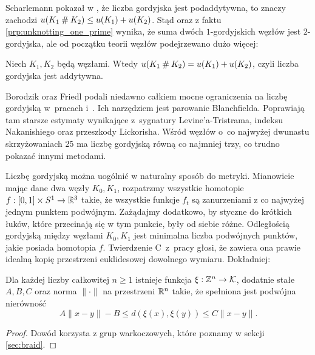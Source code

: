 Scharlemann pokazał w \cite[wniosek 1.6]{scharlemann98}, że liczba gordyjska jest podaddytywna, to znaczy zachodzi $u(K_1 \mathbin{\#} K_2) \le u(K_1) + u(K_2)$.
Stąd oraz z faktu \ref{prp:unknotting_one_prime} wynika, że suma dwóch $1$-gordyjskich węzłów jest $2$-gordyjska, ale od początku teorii węzłów podejrzewano dużo więcej:

\begin{conjecture}
    Niech $K_1, K_2$ będą węzłami.
    Wtedy $u(K_1 \mathbin{\#} K_2) = u(K_1) + u(K_2)$, czyli liczba gordyjska jest addytywna.
\end{conjecture}

Borodzik oraz Friedl podali niedawno całkiem mocne ograniczenia na liczbę gordyjską w~pracach \cite{borodzik14} i~\cite{borodzik15}.
Ich narzędziem jest parowanie Blanchfielda.
Poprawiają tam starsze estymaty wynikające z~sygnatury Levine'a-Tristrama, indeksu Nakanishiego oraz przeszkody Lickorisha.
%
%
%
%
Wśród węzłów o~co najwyżej dwunastu skrzyżowaniach 25 ma liczbę gordyjską równą co najmniej trzy, co trudno pokazać innymi metodami.

Liczbę gordyjską można uogólnić w naturalny sposób do metryki.
Mianowicie mając dane dwa węzły $K_0, K_1$, rozpatrzmy wszystkie homotopie $f : [0,1] \times S^1 \to \mathbb R^3$ takie, że wszystkie funkcje $f_t$ są zanurzeniami z co najwyżej jednym punktem podwójnym.
Zażądajmy dodatkowo, by styczne do krótkich łuków, które przecinają się w tym punkcie, były od siebie różne.
Odległością gordyjską między węzłami $K_0, K_1$ jest minimalna liczba podwójnych punktów, jakie posiada homotopia $f$.
Twierdzenie C~z~pracy \cite{gambaudo05} głosi, że zawiera ona prawie idealną kopię przestrzeni euklidesowej dowolnego wymiaru.
Dokładniej:

\begin{proposition}
    Dla każdej liczby całkowitej $n \ge 1$ istnieje funkcja $\xi: \mathbb Z^n \to \mathcal{K}$, dodatnie stałe $A, B, C$ oraz norma $\|\cdot\|$ na przestrzeni $\mathbb R^n$ takie, że spełniona jest podwójna nierówność
    \begin{equation}
        A\|x-y\|  - B \le d(\xi(x), \xi(y)) \le C\|x-y\|.
    \end{equation}
\end{proposition}

\begin{proof}
    Dowód korzysta z grup warkoczowych, które poznamy w sekcji \ref{sec:braid}.
\end{proof}


